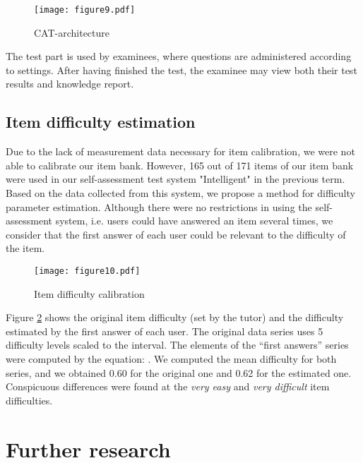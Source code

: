 \documentclass[11pt,twoside]{article}
\begin{document}
\begin{figure}[t]
\begin{center}    \texttt{[image: figure9.pdf]} \end{center}
\caption{\label{fig:cat_architecture} CAT-architecture} 
\end{figure}

The test part is used by examinees, where questions are administered according to settings. After having finished the test, the examinee may view both their test results and knowledge report.




\subsection{Item difficulty estimation}


Due to the lack of measurement data necessary for item calibration, we were not able to calibrate our item bank. However, 165 out of 171 items of our item bank were used in our self-assessment test system "Intelligent" in the previous term. Based on the data collected from this system, we propose a method for difficulty parameter estimation. Although there were no restrictions in using the self-assessment system, i.e. users could have answered an item several times, we consider that the first answer of each user could be  relevant to the difficulty of the item. 

\begin{figure}[t]
\begin{center}    \texttt{[image: figure10.pdf]} \end{center}
\caption{\label{fig:itemcalibration1} Item difficulty calibration} 
\end{figure}

Figure \ref{fig:itemcalibration1} shows the original item difficulty (set by the tutor) and the difficulty estimated by the first answer of each user. The original data series uses 5 difficulty levels scaled to the  interval. The elements of the ``first answers'' series were computed by the equation:  . We computed the mean difficulty for both series, and we obtained 0.60 for the original one and 0.62 for the estimated one. Conspicuous differences were found at the \textit{very easy} and \textit{very difficult} item difficulties.


\section{Further research}
\end{document}
